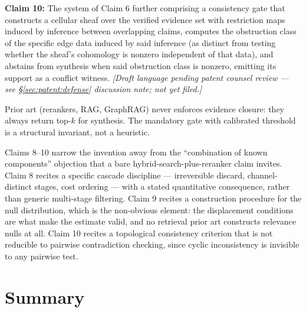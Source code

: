 \begin{patentclaim}
\textbf{Claim 10:} The system of Claim 6 further comprising a consistency gate that constructs a cellular sheaf over the verified evidence set with restriction maps induced by inference between overlapping claims, computes the obstruction class of the specific edge data induced by said inference (as distinct from testing whether the sheaf's cohomology is nonzero independent of that data), and abstains from synthesis when said obstruction class is nonzero, emitting its support as a conflict witness. \emph{[Draft language pending patent counsel review --- see \S\ref{sec:patent:defense} discussion note; not yet filed.]}
\end{patentclaim}

\begin{patentdiscussion}
Prior art (rerankers, RAG, GraphRAG) never enforces evidence closure: they always return top-$k$ for synthesis. The mandatory gate with calibrated threshold is a structural invariant, not a heuristic.

Claims 8--10 narrow the invention away from the ``combination of known components'' objection that a bare hybrid-search-plus-reranker claim invites. Claim 8 recites a specific cascade discipline --- irreversible discard, channel-distinct stages, cost ordering --- with a stated quantitative consequence, rather than generic multi-stage filtering. Claim 9 recites a construction procedure for the null distribution, which is the non-obvious element: the displacement conditions are what make the estimate valid, and no retrieval prior art constructs relevance nulls at all. Claim 10 recites a topological consistency criterion that is not reducible to pairwise contradiction checking, since cyclic inconsistency is invisible to any pairwise test.
\end{patentdiscussion}

\section{Summary}
\label{sec:retrieval:summary}

